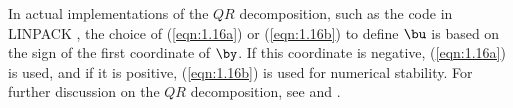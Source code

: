 In actual implementations of the $QR$ decomposition, such as the
code in LINPACK \cite[Chapter 9]{dong:bunc:mole:stew:1979}, the choice
of (\ref{eqn:1.16a})
or (\ref{eqn:1.16b}) to
define $\bu$ is based on the sign of the first coordinate of $\by$.
If this coordinate is negative, (\ref{eqn:1.16a}) is used, and if it is
positive, (\ref{eqn:1.16b}) is used for numerical stability.
For further discussion on the $QR$ decomposition, see
and .

